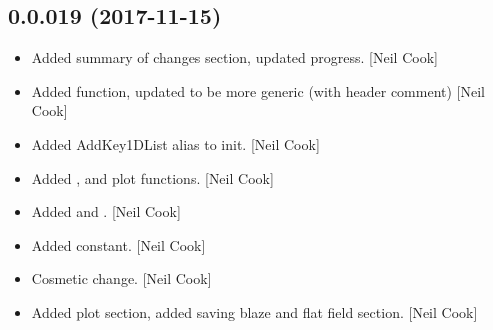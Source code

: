 \documentclass[a4paper,10pt,english]{report}
\begin{document}
\subsection{0.0.019 (2017-11-15)}
\label{\detokenize{misc/changelog:id531}}\begin{itemize}
\item {} 
Added  summary of changes section, updated progress. {[}Neil
Cook{]}

\item {} 
Added  function, updated  to be more
generic (with header comment) {[}Neil Cook{]}

\item {} 
Added AddKey1DList alias to init. {[}Neil Cook{]}

\item {} 
Added ,
 and  plot
functions. {[}Neil Cook{]}

\item {} 
Added  and . {[}Neil Cook{]}

\item {} 
Added  constant. {[}Neil Cook{]}

\item {} 
Cosmetic change. {[}Neil Cook{]}

\item {} 
Added plot section, added saving blaze and flat field section. {[}Neil
Cook{]}

\end{itemize}
\end{document}
